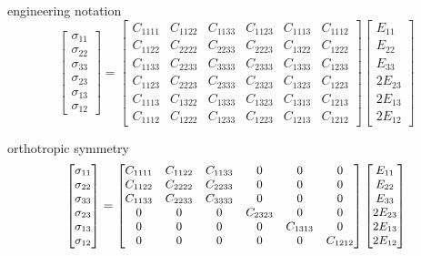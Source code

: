 \documentclass[
  letterpaper,
  ignorenonframetext,
  aspectratio=43,
  handout,
  12pt]{beamer}
\begin{document}
\begin{frame}{engineering notation}
\protect\hypertarget{engineering-notation-1}{}
\[\begin{bmatrix}
  \sigma_{11} \\
\sigma_{22} \\
\sigma_{33} \\
\sigma_{23} \\
\sigma_{13} \\
\sigma_{12}
  \end{bmatrix}
  = \begin{bmatrix}
  C_{1111} & C_{1122} & C_{1133} & C_{1123} & C_{1113} & C_{1112} \\
  C_{1122} & C_{2222} & C_{2233} & C_{2223} & C_{1322} & C_{1222} \\
  C_{1133} & C_{2233} & C_{3333} & C_{2333} & C_{1333} & C_{1233} \\
  C_{1123} & C_{2223} & C_{2333} & C_{2323} & C_{1323} & C_{1223} \\
  C_{1113} & C_{1322} & C_{1333} & C_{1323} & C_{1313} & C_{1213} \\
  C_{1112} & C_{1222} & C_{1233} & C_{1223} & C_{1213} & C_{1212}
  \end{bmatrix}\begin{bmatrix}
  E_{11} \\
E_{22} \\
E_{33} \\
2E_{23} \\
2E_{13} \\
2E_{12}
\end{bmatrix}\]
\end{frame}

\begin{frame}{orthotropic symmetry}
\protect\hypertarget{orthotropic-symmetry}{}
\[\small \begin{bmatrix}
  \sigma_{11}\\
\sigma_{22} \\
\sigma_{33} \\
\sigma_{23} \\
\sigma_{13} \\
\sigma_{12}
  \end{bmatrix}
  = \begin{bmatrix}
  C_{1111} & C_{1122} & C_{1133} & 0 & 0 & 0 \\
  C_{1122} & C_{2222} & C_{2233} & 0 & 0 & 0 \\
  C_{1133} & C_{2233} & C_{3333} & 0 & 0 & 0 \\
  0 & 0 & 0 & C_{2323} & 0 & 0 \\
  0 & 0 & 0 & 0 & C_{1313} & 0 \\
  0 & 0 & 0 & 0 & 0 & C_{1212}
  \end{bmatrix}\begin{bmatrix}
  E_{11}\\
E_{22} \\
E_{33} \\
2E_{23} \\
2E_{13} \\
2E_{12}
\end{bmatrix}\]
\end{frame}
\end{document}
